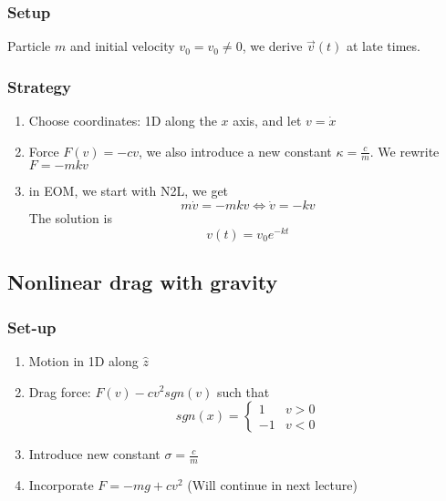 \documentclass{article}
\newtheorem{one minute paper}[theorem]{One Minute Paper}
\begin{document}
\subsubsection*{Setup} Particle $m$ and initial velocity $v_0 = v_0 \neq 0$, we derive $\vec{v}(t)$ at late times. 

\subsubsection*{Strategy}
\begin{enumerate}
    \item Choose coordinates: 1D along the $x$ axis, and let $v = \dot{x}$
    \item Force $F(v) = -cv$, we also introduce a new constant $\kappa = \frac{c}{m}$. We rewrite $F = -mkv$
    \item in EOM, we start with N2L, we get 
    \begin{equation}
        m\dot{v} = -mkv \iff \dot{v} = -kv
    \end{equation}
    The solution is 
    \begin{equation}
        v(t) = v_0e^{-kt}
    \end{equation}
\end{enumerate}

\subsection*{Nonlinear drag with gravity}

\subsubsection*{Set-up}
\begin{enumerate}
    \item Motion in 1D along $\hat{z}$
    \item Drag force: $F(v) -cv^2 sgn(v)$ such that 
    \[
        sgn(x) = 
        \begin{cases}
            1 & v > 0 \\
            -1 & v < 0
        \end{cases}
    \]
    \item Introduce new constant $\sigma = \frac{c}{m}$
    \item Incorporate $F = -mg + cv^2$ (Will continue in next lecture)
\end{enumerate}
\end{document}
